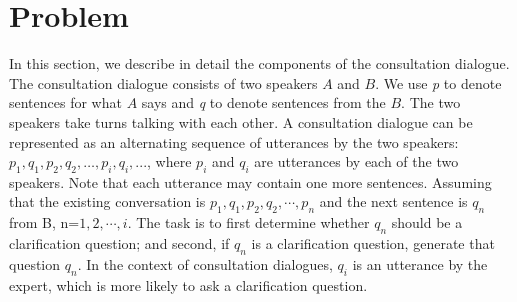 \section{Problem}
\label{problem}

In this section, we describe in detail the components of the consultation 
dialogue. The consultation dialogue consists of two speakers $A$ and $B$. 
We use \emph{p} to denote sentences for what $A$ says and \emph{q} to 
denote sentences from the $B$. The two speakers take turns talking with 
each other. A consultation dialogue can be represented as an alternating 
sequence of utterances by the two speakers:  
$p_{1}, q_{1}, p_{2}, q_{2}, \ldots, p_{i}, q_{i}, ...$, 
where $p_i$ and $q_i$ are utterances
by each of the two speakers. Note that each utterance may contain one more sentences. Assuming that the existing conversation is $p_{1}, q_{1}, p_{2}, q_{2}, \cdots, p_{n}$ and the next sentence is $q_{n}$ from B, n=$1, 2, \cdots, i$.  The task is to first determine whether $q_{n}$ should be
a clarification question; and second, if $q_{n}$ is a clarification question, 
generate that question $q_{n}$. In the context of consultation dialogues,
$q_i$ is an utterance by the expert, which is more likely to ask a 
clarification question.
